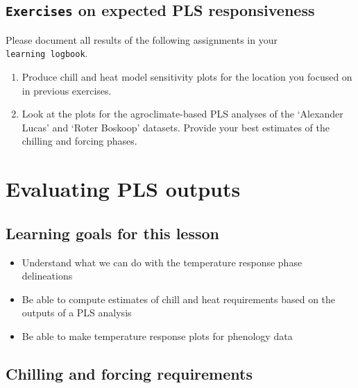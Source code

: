 \documentclass[
]{book}
\providecommand{\tightlist}{%
  \setlength{\itemsep}{0pt}\setlength{\parskip}{0pt}}
\begin{document}
\hypertarget{exercises_PLS_chillforce_reflection}{%
\section*{\texorpdfstring{\texttt{Exercises} on expected PLS responsiveness}{Exercises on expected PLS responsiveness}}\label{exercises_PLS_chillforce_reflection}}

Please document all results of the following assignments in your \texttt{learning\ logbook}.

\begin{enumerate}
\def\labelenumi{\arabic{enumi})}
\tightlist
\item
  Produce chill and heat model sensitivity plots for the location you focused on in previous exercises.
\item
  Look at the plots for the agroclimate-based PLS analyses of the `Alexander Lucas' and `Roter Boskoop' datasets. Provide your best estimates of the chilling and forcing phases.
\end{enumerate}

\hypertarget{pls_eval_PLS}{%
\chapter{Evaluating PLS outputs}\label{pls_eval_PLS}}

\hypertarget{goals_PLS_eval}{%
\section*{Learning goals for this lesson}\label{goals_PLS_eval}}

\begin{itemize}
\tightlist
\item
  Understand what we can do with the temperature response phase delineations
\item
  Be able to compute estimates of chill and heat requirements based on the outputs of a PLS analysis
\item
  Be able to make temperature response plots for phenology data
\end{itemize}

\hypertarget{chilling-and-forcing-requirements}{%
\section{Chilling and forcing requirements}\label{chilling-and-forcing-requirements}}
\end{document}
